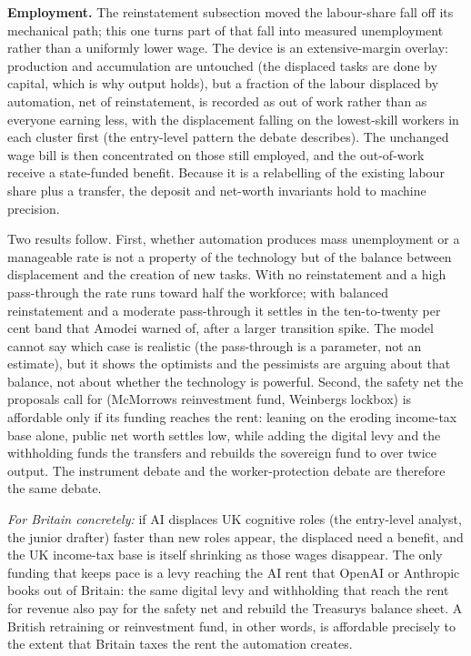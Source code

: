 \documentclass[11pt]{article}
\begin{document}
\textbf{Employment.} The reinstatement subsection moved the labour-share
fall off its mechanical path; this one turns part of that fall into
measured unemployment rather than a uniformly lower wage. The device is
an extensive-margin overlay: production and accumulation are untouched
(the displaced tasks are done by capital, which is why output holds),
but a fraction of the labour displaced by automation, net of
reinstatement, is recorded as out of work rather than as everyone
earning less, with the displacement falling on the lowest-skill workers
in each cluster first (the entry-level pattern the debate describes).
The unchanged wage bill is then concentrated on those still employed,
and the out-of-work receive a state-funded benefit. Because it is a
relabelling of the existing labour share plus a transfer, the deposit
and net-worth invariants hold to machine precision.

Two results follow. First, whether automation produces mass unemployment
or a manageable rate is not a property of the technology but of the
balance between displacement and the creation of new tasks. With no
reinstatement and a high pass-through the rate runs toward half the
workforce; with balanced reinstatement and a moderate pass-through it
settles in the ten-to-twenty per cent band that Amodei warned of, after
a larger transition spike. The model cannot say which case is realistic
(the pass-through is a parameter, not an estimate), but it shows the
optimists and the pessimists are arguing about that balance, not about
whether the technology is powerful. Second, the safety net the proposals
call for (McMorrow\textquotesingle s reinvestment fund,
Weinberg\textquotesingle s lockbox) is affordable only if its funding
reaches the rent: leaning on the eroding income-tax base alone, public
net worth settles low, while adding the digital levy and the withholding
funds the transfers and rebuilds the sovereign fund to over twice
output. The instrument debate and the worker-protection debate are
therefore the same debate.

\emph{For Britain concretely:} if AI displaces UK cognitive roles (the
entry-level analyst, the junior drafter) faster than new roles appear,
the displaced need a benefit, and the UK income-tax base is itself
shrinking as those wages disappear. The only funding that keeps pace is
a levy reaching the AI rent that OpenAI or Anthropic books out of
Britain: the same digital levy and withholding that reach the rent for
revenue also pay for the safety net and rebuild the
Treasury\textquotesingle s balance sheet. A British retraining or
reinvestment fund, in other words, is affordable precisely to the extent
that Britain taxes the rent the automation creates.
\end{document}
